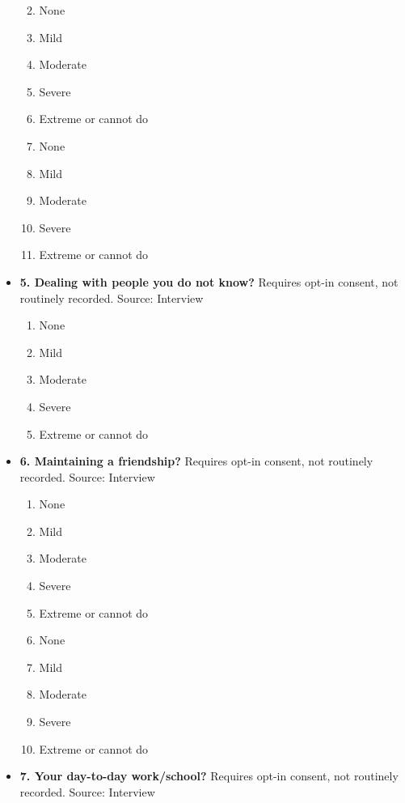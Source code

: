 \documentclass[
]{scrartcl}
\providecommand{\tightlist}{%
  \setlength{\itemsep}{0pt}\setlength{\parskip}{0pt}}\usepackage{longtable,booktabs,array}
\begin{document}
\begin{itemize}
  \begin{enumerate}
  \def\labelenumi{\arabic{enumi}.}
  \tightlist
  \item
    None
  \item
    Mild
  \item
    Moderate
  \item
    Severe
  \item
    Extreme or cannot do
  \item
    None
  \item
    Mild
  \item
    Moderate
  \item
    Severe
  \item
    Extreme or cannot do
  \end{enumerate}
\item
  \textbf{5. Dealing with people you do not know?} Requires opt-in
  consent, not routinely recorded. Source: Interview

  \begin{enumerate}
  \def\labelenumi{\arabic{enumi}.}
  \tightlist
  \item
    None
  \item
    Mild
  \item
    Moderate
  \item
    Severe
  \item
    Extreme or cannot do
  \end{enumerate}
\item
  \textbf{6. Maintaining a friendship?} Requires opt-in consent, not
  routinely recorded. Source: Interview

  \begin{enumerate}
  \def\labelenumi{\arabic{enumi}.}
  \tightlist
  \item
    None
  \item
    Mild
  \item
    Moderate
  \item
    Severe
  \item
    Extreme or cannot do
  \item
    None
  \item
    Mild
  \item
    Moderate
  \item
    Severe
  \item
    Extreme or cannot do
  \end{enumerate}
\item
  \textbf{7. Your day-to-day work/school?} Requires opt-in consent, not
  routinely recorded. Source: Interview


\end{itemize}
\end{document}
